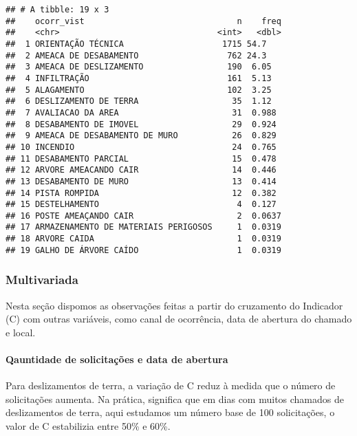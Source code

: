 \documentclass[
]{article}
\begin{document}
\begin{verbatim}
## # A tibble: 19 x 3
##    ocorr_vist                               n    freq
##    <chr>                                <int>   <dbl>
##  1 ORIENTAÇÃO TÉCNICA                    1715 54.7   
##  2 AMEACA DE DESABAMENTO                  762 24.3   
##  3 AMEACA DE DESLIZAMENTO                 190  6.05  
##  4 INFILTRAÇÃO                            161  5.13  
##  5 ALAGAMENTO                             102  3.25  
##  6 DESLIZAMENTO DE TERRA                   35  1.12  
##  7 AVALIACAO DA AREA                       31  0.988 
##  8 DESABAMENTO DE IMOVEL                   29  0.924 
##  9 AMEACA DE DESABAMENTO DE MURO           26  0.829 
## 10 INCENDIO                                24  0.765 
## 11 DESABAMENTO PARCIAL                     15  0.478 
## 12 ARVORE AMEACANDO CAIR                   14  0.446 
## 13 DESABAMENTO DE MURO                     13  0.414 
## 14 PISTA ROMPIDA                           12  0.382 
## 15 DESTELHAMENTO                            4  0.127 
## 16 POSTE AMEAÇANDO CAIR                     2  0.0637
## 17 ARMAZENAMENTO DE MATERIAIS PERIGOSOS     1  0.0319
## 18 ARVORE CAIDA                             1  0.0319
## 19 GALHO DE ÁRVORE CAÍDO                    1  0.0319
\end{verbatim}

\hypertarget{multivariada}{%
\subsubsection{Multivariada}\label{multivariada}}

Nesta seção dispomos as observações feitas a partir do cruzamento do
Indicador (C) com outras variáveis, como canal de ocorrência, data de
abertura do chamado e local.

\hypertarget{qauntidade-de-solicitauxe7uxf5es-e-data-de-abertura}{%
\paragraph{Qauntidade de solicitações e data de
abertura}\label{qauntidade-de-solicitauxe7uxf5es-e-data-de-abertura}}

Para deslizamentos de terra, a variação de C reduz à medida que o número
de solicitações aumenta. Na prática, significa que em dias com muitos
chamados de deslizamentos de terra, aqui estudamos um número base de 100
solicitações, o valor de C estabilizia entre 50\% e 60\%.
\end{document}
